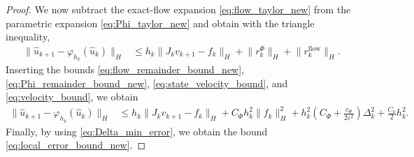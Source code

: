 \documentclass[oneside,11pt]{article}
\theoremstyle{remark}
\theoremstyle{thmstyleone}
\theoremstyle{thmstylethree}
\theoremstyle{thmstyletwo}
\newcommand{\norm}[1]{\lVert #1\rVert}
\newcommand{\tc}[1]{#1}
\begin{document}
\begin{proof}
  We now subtract the exact-flow expansion
  \eqref{eq:flow_taylor_new} from the parametric expansion
  \eqref{eq:Phi_taylor_new} and obtain with the triangle inequality,
  \begin{align}
    \norm{\hat u_{k+1}-\varphi_{h_k}(\hat u_k)}_H
     & \le
    h_k\norm{J_kv_{k+1}-f_k}_H
    +
    \norm{r_k^\Phi}_H
    +
    \norm{r_k^{\mathrm{flow}}}_H .
    \label{eq:local_difference_bound_new}
  \end{align}
  Inserting the bounds
  \eqref{eq:flow_remainder_bound_new},
  \eqref{eq:Phi_remainder_bound_new},
  \tc{ \eqref{eq:state_velocity_bound},
      and \eqref{eq:velocity_bound}}, we obtain
  \begin{align}
    \norm{\hat u_{k+1}-\varphi_{h_k}(\hat u_k)}_H
     & \le
    h_k\norm{J_kv_{k+1}-f_k}_H
    +
    C_\Phi h_k^2\norm{f_k}_H^2
    +
    \tc{
    h_k^2
    \left(
    C_\Phi+\frac{c_\Phi}{2\varepsilon^2}
    \right)\Delta_k^2}
    +
    \frac{C_a}{2}h_k^2 .
    \label{eq:local_error_before_defect_new}
  \end{align}
  Finally, by using \eqref{eq:Delta_min_error}, we obtain the bound \eqref{eq:local_error_bound_new}.
\end{proof}
\end{document}
